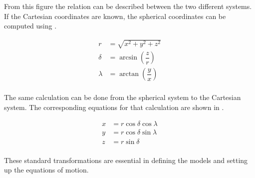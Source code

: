 \noindent
From this figure the relation can be described between the two different systems. If the Cartesian coordinates are known, the spherical coordinates can be computed using .

\begin{equation} \label{eq:cart2spher}
\begin{split}
r &= \sqrt{x^{2}+y^{2}+z^{2}}\\
\delta &= \arcsin \left(\dfrac{z}{r}\right)\\
\lambda &= \arctan \left(\dfrac{y}{x}\right)\\
\end{split}
\end{equation}




\noindent
The same calculation can be done from the spherical system to the Cartesian system. The corresponding equations for that calculation are shown in .

\begin{equation} \label{eq:spher2cart}
\begin{split}
x &= r\cos\delta\cos\lambda\\
y &= r\cos\delta\sin\lambda\\
z &= r\sin\delta\\
\end{split}
\end{equation}

\noindent
These standard transformations are essential in defining the models and setting up the equations of motion.











